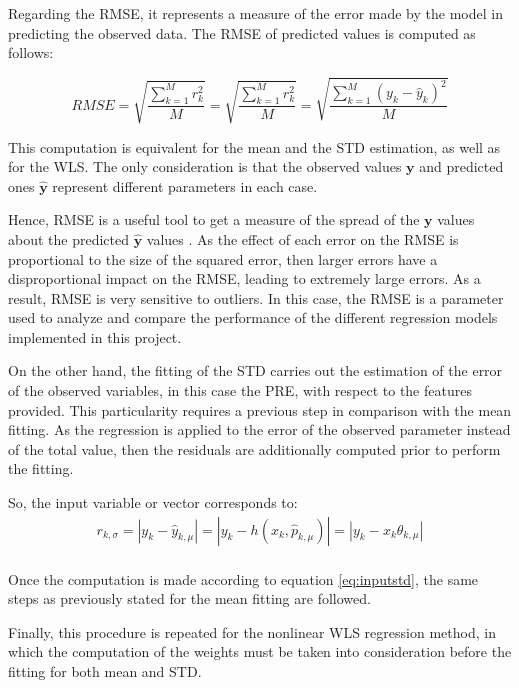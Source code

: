 \documentclass[a4paper, report, oneside, UKenglish]{memoir}
\newcommand{\by}{\boldsymbol{y}}
\begin{document}
Regarding the RMSE, it represents a measure of the error made by the model in predicting the observed data. The RMSE of predicted values is computed as follows:

\begin{equation}
    RMSE = \sqrt{\frac{\sum\limits_{k=1}^{M}{r}_{k}^{2}}{M}} = \sqrt{\frac{\sum\limits_{k=1}^{M}{r}_{k}^{2}}{M}} = \sqrt{\frac{\sum\limits_{k=1}^{M}(y_k - \hat{y}_k)^2}{M}} 
\end{equation}

This computation is equivalent for the mean and the STD estimation, as well as for the WLS. The only consideration is that the observed values $\by$ and predicted ones $\hat{\by}$ represent different parameters in each case.  
 
Hence, RMSE is a useful tool to get a measure of the spread of the $\by$ values about the predicted $\hat{\by}$ values \cite{StanfordRMSE}. As the effect of each error on the RMSE is proportional to the size of the squared error, then larger errors have a disproportional impact on the RMSE, leading to extremely large errors. As a result, RMSE is very sensitive to outliers. In this case, the RMSE is a parameter used to analyze and compare the performance of the different regression models implemented in this project.   

On the other hand, the fitting of the STD carries out the estimation of the error of the observed variables, in this case the PRE, with respect to the features provided. This particularity requires a previous step in comparison with the mean fitting. As the regression is applied to the error of the observed parameter instead of the total value, then the residuals are additionally computed prior to perform the fitting.  

So, the input variable or vector corresponds to:
\begin{equation}\label{eq:inputstd}
\begin{split}
    r_{k,\sigma} = |y_k - \hat{y}_{k,\mu}| = |y_k - h(x_{k},\hat{p}_{k,\mu})| = |y_k - x_{k}\theta_{k,\mu}|\\
\end{split}
\end{equation}

Once the computation is made according to equation \eqref{eq:inputstd}, the same steps as previously stated for the mean fitting are followed. 

Finally, this procedure is repeated for the nonlinear WLS regression method, in which the computation of the weights must be taken into consideration before the fitting for both mean and STD. 
\end{document}
